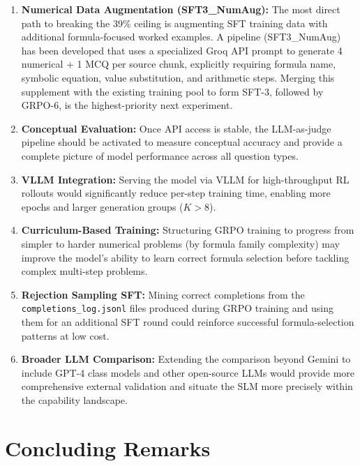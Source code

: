 \documentclass[12pt]{report}
\begin{document}
\begin{enumerate}
    \item \textbf{Numerical Data Augmentation (SFT3\_NumAug):} The most direct path to breaking the 39\% ceiling is augmenting SFT training data with additional formula-focused worked examples. A pipeline (SFT3\_NumAug) has been developed that uses a specialized Groq API prompt to generate 4 numerical + 1 MCQ per source chunk, explicitly requiring formula name, symbolic equation, value substitution, and arithmetic steps. Merging this supplement with the existing training pool to form SFT-3, followed by GRPO-6, is the highest-priority next experiment.
    
    \item \textbf{Conceptual Evaluation:} Once API access is stable, the LLM-as-judge pipeline should be activated to measure conceptual accuracy and provide a complete picture of model performance across all question types.
    
    \item \textbf{VLLM Integration:} Serving the model via VLLM for high-throughput RL rollouts would significantly reduce per-step training time, enabling more epochs and larger generation groups ($K > 8$).
    
    \item \textbf{Curriculum-Based Training:} Structuring GRPO training to progress from simpler to harder numerical problems (by formula family complexity) may improve the model's ability to learn correct formula selection before tackling complex multi-step problems.
    
    \item \textbf{Rejection Sampling SFT:} Mining correct completions from the \texttt{completions\_log.jsonl} files produced during GRPO training and using them for an additional SFT round could reinforce successful formula-selection patterns at low cost.

    \item \textbf{Broader LLM Comparison:} Extending the comparison beyond Gemini to include GPT-4 class models and other open-source LLMs would provide more comprehensive external validation and situate the SLM more precisely within the capability landscape.
\end{enumerate}

\section{Concluding Remarks}
\end{document}
